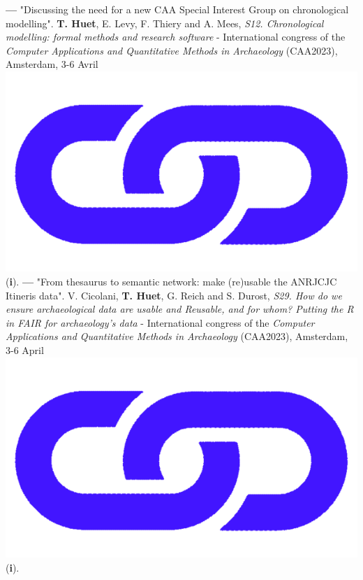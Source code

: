 \documentclass{article}
\begin{document}
{\smallbreak
\textbf{--- }"Discussing the need for a new CAA Special Interest Group on chronological modelling". \textbf{T. Huet}, E. Levy, F. Thiery and A. Mees, \textit{S12. Chronological modelling: formal methods and research software} - International congress of the \textit{Computer Applications and Quantitative Methods in Archaeology} (CAA2023), Amsterdam, 3-6 Avril \href{https://historical-time.github.io/caa23/sig/pres}{\includegraphics[scale=0.02]{link_darkblue.png}} (\textbf{i}).
\smallbreak
\textbf{--- }"From thesaurus to semantic network: make (re)usable the ANRJCJC Itineris data". V. Cicolani, \textbf{T. Huet}, G. Reich and S. Durost, \textit{S29. How do we ensure archaeological data are usable and Reusable, and for whom? Putting the R in FAIR for archaeology's data} - International congress of the \textit{Computer Applications and Quantitative Methods in Archaeology} (CAA2023), Amsterdam, 3-6 April \href{https://anr-itineris.github.io/itineris/talk/caa-2023/thesaurus/pres/#/title-slide}{\includegraphics[scale=0.02]{link_darkblue.png}} (\textbf{i}).
\smallbreak
}
\end{document}
